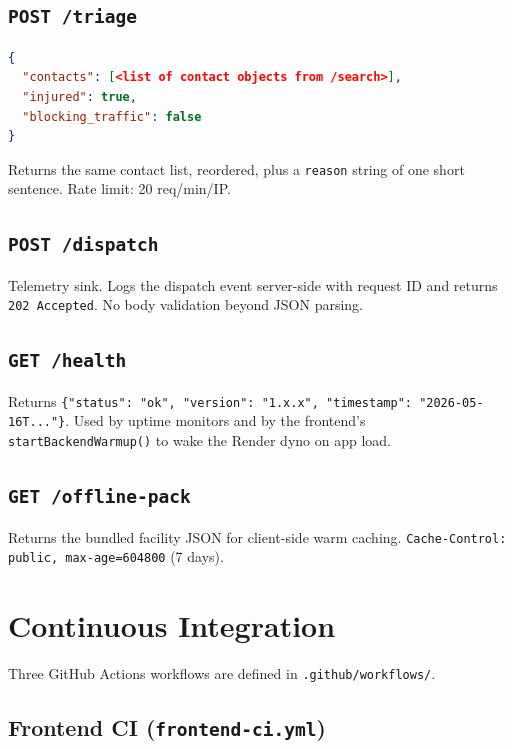 \documentclass[11pt, a4paper]{article}
\newcommand{\file}[1]{\texttt{\small\color{rsblue}#1}}
\newcommand{\code}[1]{\texttt{\small#1}}
\begin{document}
\subsection{\texttt{POST /triage}}

\begin{lstlisting}[language=json,numbers=none,caption={Request body}]
{
  "contacts": [<list of contact objects from /search>],
  "injured": true,
  "blocking_traffic": false
}
\end{lstlisting}

Returns the same contact list, reordered, plus a \code{reason} string of one short sentence. Rate limit: 20 req/min/IP.

\subsection{\texttt{POST /dispatch}}

Telemetry sink. Logs the dispatch event server-side with request ID and returns \code{202 Accepted}. No body validation beyond JSON parsing.

\subsection{\texttt{GET /health}}

Returns \code{\{"status": "ok", "version": "1.x.x", "timestamp": "2026-05-16T..."\}}. Used by uptime monitors and by the frontend's \code{startBackendWarmup()} to wake the Render dyno on app load.

\subsection{\texttt{GET /offline-pack}}

Returns the bundled facility JSON for client-side warm caching. \code{Cache-Control: public, max-age=604800} (7 days).

\section{Continuous Integration}

Three GitHub Actions workflows are defined in \file{.github/workflows/}.

\subsection{Frontend CI (\texttt{frontend-ci.yml})}
\end{document}
